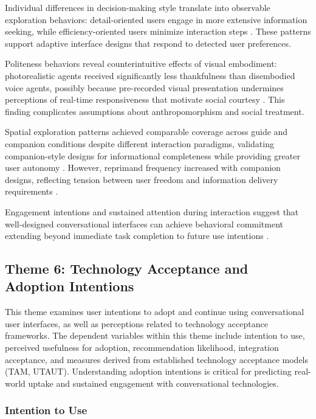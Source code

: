 \documentclass[manuscript,anonymous,sigconf]{acmart}
\begin{document}
Individual differences in decision-making style translate into observable exploration behaviors: detail-oriented users engage in more extensive information seeking, while efficiency-oriented users minimize interaction steps \cite{A42}. These patterns support adaptive interface designs that respond to detected user preferences.

Politeness behaviors reveal counterintuitive effects of visual embodiment: photorealistic agents received significantly less thankfulness than disembodied voice agents, possibly because pre-recorded visual presentation undermines perceptions of real-time responsiveness that motivate social courtesy \cite{A86}. This finding complicates assumptions about anthropomorphism and social treatment.

Spatial exploration patterns achieved comparable coverage across guide and companion conditions despite different interaction paradigms, validating companion-style designs for informational completeness while providing greater user autonomy \cite{A82}. However, reprimand frequency increased with companion designs, reflecting tension between user freedom and information delivery requirements \cite{A82}.

Engagement intentions and sustained attention during interaction suggest that well-designed conversational interfaces can achieve behavioral commitment extending beyond immediate task completion to future use intentions \cite{A22, A81}.

\subsection{Theme 6: Technology Acceptance and Adoption Intentions}

This theme examines user intentions to adopt and continue using conversational user interfaces, as well as perceptions related to technology acceptance frameworks. The dependent variables within this theme include intention to use, perceived usefulness for adoption, recommendation likelihood, integration acceptance, and measures derived from established technology acceptance models (TAM, UTAUT). Understanding adoption intentions is critical for predicting real-world uptake and sustained engagement with conversational technologies.

\subsubsection{Intention to Use}
\end{document}
